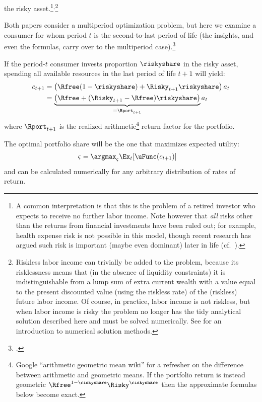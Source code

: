   the risky asset.\footnote{A common interpretation is that this is
    the problem of a retired investor who expects to receive no
    further labor income.  Note however that {\it all} risks other
    than the returns from financial investments have been ruled out;
    for example, health expense risk is not possible in this model,
    though recent research has argued such risk is important (maybe even dominant) later in
    life (cf.\ \cite{aclvJoy}).}$^{,}$\footnote{Riskless labor income can trivially be added
    to the problem, because its risklessness means that (in the
    absence of liquidity constraints) it is indistinguishable from a
    lump sum of extra current wealth with a value equal to the present
    discounted value (using the riskless rate) of the (riskless)
    future labor income.  Of course, in practice, labor income is not
    riskless, but when labor income is risky the problem no longer has
    the tidy analytical solution described here and must be solved
    numerically.  See \cite{SolvingMicroDSOPs} for an introduction to
    numerical solution methods.}

Both papers consider a multiperiod optimization problem, but here we
examine a consumer for whom period $t$ is the
second-to-last period of life (the insights, and even the formulas,
carry over to the multiperiod case).\footnote{\cite{samuelson1979we}.}

If the period-$t$ consumer invests proportion $\riskyshare$ in the risky asset,
spending all available resources in the last period of life $t+1$ will yield:
\begin{equation}\begin{gathered}\begin{aligned}
        c_{t+1} & =  \left(\Rfree(1-\riskyshare)+\Risky_{t+1}\riskyshare\right)a_{t} \notag
\\ & =  \underbrace{\left(\Rfree+(\Risky_{t+1}-\Rfree)\riskyshare\right)}_{\equiv \Rport_{t+1}}a_{t} \label{eq:RportDef}
\end{aligned}\end{gathered}\end{equation}
where $\Rport_{t+1}$ is the realized arithmetic\footnote{Google ``arithmetic geometric mean wiki'' for a refresher on the difference between arithmetic and geometric means.  If the portfolio return is instead geometric $\Rfree^{1-\riskyshare}\Risky^{\riskyshare}$ then the approximate formulas below become exact.} return factor for the portfolio.

The optimal portfolio share will be the one that maximizes expected utility:
\begin{equation}\begin{gathered}\begin{aligned}
  \varsigma & =  \argmax_{\varsigma} \Ex_{t}[\uFunc(c_{t+1})]
\end{aligned}\end{gathered}\end{equation}
and can be calculated numerically for any arbitrary distribution of rates of return.

